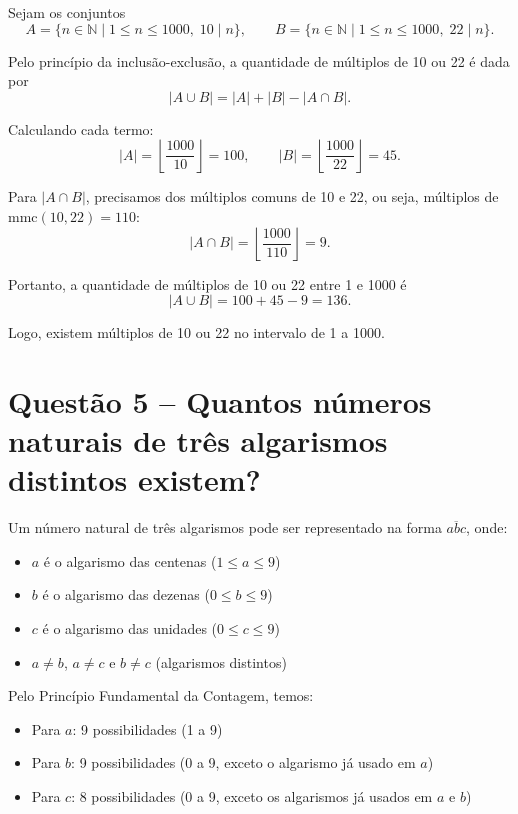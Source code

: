 \documentclass[12pt,a4paper]{article}
\begin{document}
    Sejam os conjuntos
    \[
    A=\{n\in\mathbb{N}\mid 1\le n\le 1000,\; 10\mid n\},\qquad
    B=\{n\in\mathbb{N}\mid 1\le n\le 1000,\; 22\mid n\}.
    \]
    
    Pelo princípio da inclusão-exclusão, a quantidade de múltiplos de 10 ou 22 é dada por
    \[
    |A\cup B| = |A| + |B| - |A\cap B|.
    \]
    
    Calculando cada termo:
    \[
    |A| = \left\lfloor\frac{1000}{10}\right\rfloor = 100,\qquad
    |B| = \left\lfloor\frac{1000}{22}\right\rfloor = 45.
    \]
    
    Para $|A\cap B|$, precisamos dos múltiplos comuns de 10 e 22, ou seja, múltiplos de $\mathrm{mmc}(10,22) = 110$:
    \[
    |A\cap B| = \left\lfloor\frac{1000}{110}\right\rfloor = 9.
    \]
    
    Portanto, a quantidade de múltiplos de 10 ou 22 entre 1 e 1000 é
    \[
    |A\cup B| = 100 + 45 - 9 = \boxed{136}.
    \]
    
    Logo, existem  múltiplos de 10 ou 22 no intervalo de 1 a 1000.


\section*{Questão 5 -- Quantos números naturais de três algarismos distintos existem?}

    Um número natural de três algarismos pode ser representado na forma $\overline{abc}$, onde:
    \begin{itemize}
        \item $a$ é o algarismo das centenas ($1 \leq a \leq 9$)
        \item $b$ é o algarismo das dezenas ($0 \leq b \leq 9$)
        \item $c$ é o algarismo das unidades ($0 \leq c \leq 9$)
        \item $a \neq b$, $a \neq c$ e $b \neq c$ (algarismos distintos)
    \end{itemize}

    Pelo Princípio Fundamental da Contagem, temos:
    \begin{itemize}
        \item Para $a$: 9 possibilidades (1 a 9)
        \item Para $b$: 9 possibilidades (0 a 9, exceto o algarismo já usado em $a$)
        \item Para $c$: 8 possibilidades (0 a 9, exceto os algarismos já usados em $a$ e $b$)
    \end{itemize}
\end{document}
